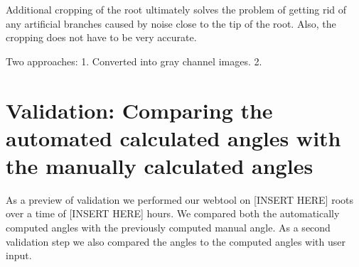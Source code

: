 Additional cropping of the root ultimately solves the problem of getting rid of any artificial branches caused by noise close to the tip of the root.
Also, the cropping does not have to be very accurate.



%
%
%
%
%
%


Two approaches:
1.
Converted into gray channel images.
2.



\section{Validation: Comparing the automated calculated angles with the manually calculated angles}

As a preview of validation we performed our webtool on [INSERT HERE] roots over a time of [INSERT HERE] hours. We compared both the automatically computed angles with the previously computed manual angle. As a second validation step we also compared the angles to the computed angles with user input.

